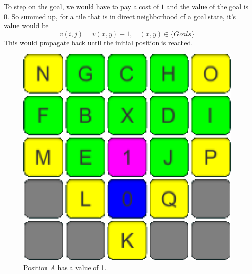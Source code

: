 \documentclass[conference]{IEEEtran}
\begin{document}
To step on the goal, we would have to pay a cost of $1$ and the value of the goal is $0$. So summed up, for a tile that is in direct neighborhood of a goal state, it's value would be
\begin{equation}
v(i,j) = v(x,y) + 1, \quad (x,y) \in \{Goals\}
\end{equation}
This would propagate back until the initial position is reached.
\begin{figure}[h]
\centering
\begin{minipage}[t]{0.3\linewidth}
\centering
\includegraphics[width=1\textwidth]{images/ValueFunction/04.png}
\caption{Position $A$ has a value of 1.}
\end{minipage}
\begin{minipage}{0.2\linewidth}
\end{minipage}
\begin{minipage}[t]{0.3\linewidth}
\centering

\end{minipage}
\end{figure}
\end{document}
